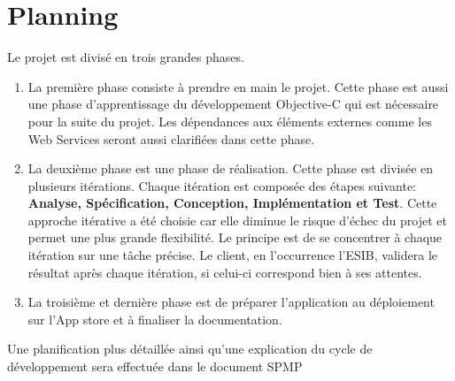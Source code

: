 \section{Planning}

Le projet est divisé en trois grandes phases.
\begin{enumerate}
\item La première phase consiste à prendre en main le projet. Cette phase est aussi une phase d'apprentissage du développement \gls{Objective-C} qui est nécessaire pour la suite du projet. Les dépendances aux éléments externes comme les Web Services seront aussi clarifiées dans cette phase.
\item La deuxième phase est une phase de réalisation. Cette phase est divisée en plusieurs itérations. Chaque itération est composée des étapes suivante: \textbf{Analyse, Spécification, Conception, Implémentation et Test}. Cette approche itérative a été choisie car elle diminue le risque d'échec du projet et permet une plus grande flexibilité. Le principe est de se concentrer à chaque itération sur une tâche précise. Le client, en l'occurrence l'\gls{ESIB}, validera le résultat après chaque itération, si celui-ci correspond bien à ses attentes.
\item La troisième et dernière phase est de préparer l'application au déploiement  sur l'App store et à finaliser la documentation.
\end{enumerate}
Une planification plus détaillée ainsi qu'une explication du cycle de développement sera effectuée dans le document \gls{SPMP}